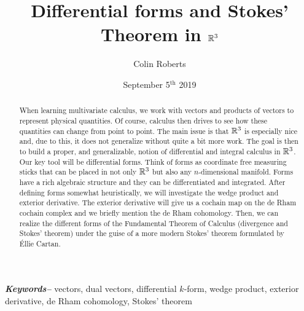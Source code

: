 \documentclass[12pt]{article}
\title{Differential forms and Stokes' Theorem in $\mathbb{R}^3$}
\author{Colin Roberts}
\date{September 5$^\textrm{th}$ 2019}
\providecommand{\keywords}[1]
{
    \hspace*{0pt}\small	
  \textbf{\textit{Keywords--}} #1
}
\begin{document}
\begin{titlingpage}
    \maketitle
    \vfill
    \begin{abstract}
       When learning multivariate calculus, we work with vectors and products of vectors to represent physical quantities.  Of course, calculus then drives to see how these quantities can change from point to point.  The main issue is that $\mathbb{R}^3$ is especially nice and, due to this, it does not generalize without quite a bit more work. The goal is then to build a proper, and generalizable, notion of differential and integral calculus in $\mathbb{R}^3$.  Our key tool will be differential forms.  Think of forms as coordinate free measuring sticks that can be placed in not only $\mathbb{R}^3$ but also any $n$-dimensional manifold.  Forms have a rich algebraic structure and they can be differentiated and integrated. After defining forms somewhat heuristically, we will investigate the wedge product and exterior derivative. The exterior derivative will give us a cochain map on the de Rham cochain complex and we briefly mention the de Rham cohomology. Then, we can realize the different forms of the Fundamental Theorem of Calculus (divergence and Stokes' theorem) under the guise of a more modern Stokes' theorem formulated by \'Ellie Cartan.
    \end{abstract}
    \keywords{vectors, dual vectors, differential $k$-form, wedge product, exterior derivative, de Rham cohomology, Stokes' theorem}
\end{titlingpage}


\end{document}
